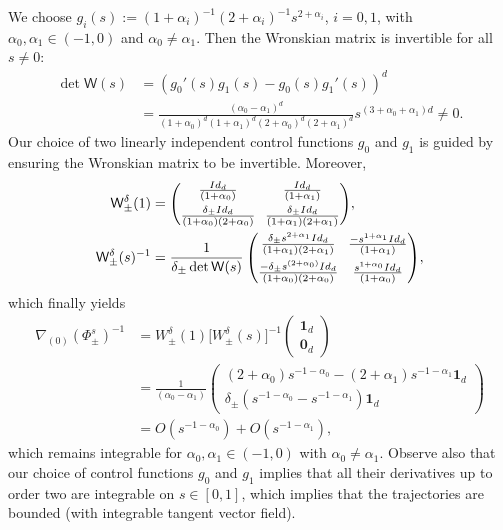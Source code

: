 \documentclass[10pt,a4paper]{amsart}
\theoremstyle{definition}
\newcommand{\sW}{{\mathsf W}}
\newcommand{\I}{\textup{Id}}\let\Id\I
\newcommand{\U}{\mathbf{1}}
\newcommand{\V}{\mathbf{0}}
\begin{document}
We choose
$g_i(s) := (1+\alpha_i)^{-1} (2+\alpha_i)^{-1} s^{2+\alpha_i}$,
$i=0,1$, with $\alpha_0, \alpha_1 \in (-1,0)$ and
$\alpha_0 \not = \alpha_1$. Then the Wronskian matrix is
invertible for all $s \not =0$:
\begin{equation}
\begin{aligned}
\label{toy-jacobian}
\det \sW(s)
&= \left(g_0'(s) g_1(s)- g_0(s) g_1'(s)\right)^d \\
&= \frac{(\alpha_0 - \alpha_1)^d}{(1+\alpha_0)^d(1+\alpha_1)^d
(2+\alpha_0)^d(2+\alpha_1)^d} s^{(3+\alpha_0+\alpha_1)d} \not = 0.
\end{aligned}
\end{equation}
Our choice of two linearly independent control functions $g_0$
and $g_1$ is guided by ensuring the Wronskian matrix to be
invertible. Moreover,
\begin{equation*}
\begin{aligned}
\sW_\pm ^\delta (1) &=\arraycolsep3.5pt
\begin{pmatrix}
\frac{\I_d}{(1+\alpha_0)} & \frac{\I_d}{(1+\alpha_1)} \\[5pt]
\frac{\delta_\pm \I_d}{(1+\alpha_0)(2+\alpha_0)} &
\frac{\delta_\pm \I_d}{(1+\alpha_1)(2+\alpha_1)}
\end{pmatrix}\!, \\
\sW_\pm ^\delta (s)^{-1} &= \frac{1}{\delta_\pm\det \sW(s)}\arraycolsep3.5pt
\begin{pmatrix}
\frac{\delta_\pm s^{2+\alpha_1} \I_d}{(1+\alpha_1)(2+\alpha_1)} &
\frac{-s^{1+\alpha_1} \I_d}{(1+\alpha_1)} \\[5pt]
\frac{-\delta_\pm s^{(2+\alpha_0)} \I_d}{(1+\alpha_0)(2+\alpha_0)}
& \frac{s^{1+\alpha_0} \I_d}{(1+\alpha_0)}
\end{pmatrix}\!,
\end{aligned}
\end{equation*}
which finally yields
\begin{align*}
\nabla_{(0)} \left(\Phi_\pm ^s \right)^{-1}
& = W^\delta_\pm(1)\big[W^\delta_\pm(s)\big]^{-1}
\begin{pmatrix}
\U_d \\ \V_d
\end{pmatrix} \\
& = \frac{1}{(\alpha_0-\alpha_1)}
\begin{pmatrix}
(2+\alpha_0) s^{-1-\alpha_0} - (2+\alpha_1) s^{-1-\alpha_1}
\U_d
\\
\delta_\pm \left(s^{-1-\alpha_0} - s^{-1-\alpha_1} \right)
\U_d
\end{pmatrix}\\
&= O(s^{-1-\alpha_0}) + O(s^{-1-\alpha_1}),
\end{align*}
which remains integrable for $\alpha_0,\alpha_1 \in
(-1,0)$ with $\alpha_0 \neq \alpha_1$. Observe also that our choice of control functions $g_0$
and $g_1$ implies that all their derivatives up to order two are
integrable on $s \in [0,1]$, which implies that the trajectories
are bounded (with integrable tangent vector field).
\end{document}
